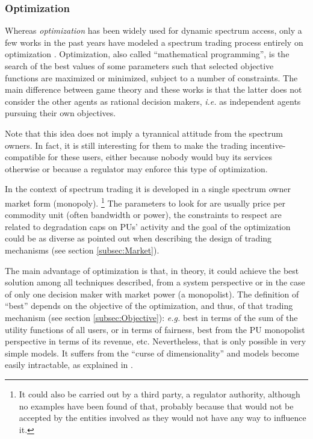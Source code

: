 \subsubsection{Optimization}
\label{sec:Optimization}
Whereas \textit{optimization} has been widely used for dynamic spectrum access, only a few works in the past years have modeled a spectrum trading process entirely on optimization \cite{ref:Mutlu2008,ref:Yang2011}. Optimization, also called ``mathematical programming'', is the search of the best values of some parameters such that selected objective functions are maximized or minimized, subject to a number of constraints. 
The main difference between game theory and these works is that the latter does not consider the other agents as rational decision makers, \textit{i.e.} as independent agents pursuing their own objectives. 

Note that this idea does not imply a tyrannical attitude from the spectrum owners. 
In fact, it is still interesting for them to make the trading incentive-compatible for these users, either because nobody would buy its services otherwise or because a regulator may enforce this type of optimization.

In the context of spectrum trading it is developed in a single spectrum owner market form (monopoly). \footnote {It could also be carried out by a third party, a regulator authority, although no examples have been found of that, probably because that would not be accepted by the entities involved as they would not have any way to influence it.}
The parameters to look for are usually price per commodity unit (often bandwidth or power), the constraints to respect are related to degradation caps on PUs' activity and the goal of the optimization could be as diverse as pointed out when describing the design of trading mechanisms (see section \ref{subsec:Market}).

The main advantage of optimization is that, in theory, it could achieve the best solution among all techniques described, from a system perspective or in the case of only one decision maker with market power (a monopolist). The definition of ``best'' depends on the objective of the optimization, and thus, of that trading mechanism (see section \ref{subsec:Objective}): \textit{e.g.} best in terms of the sum of the utility functions of all users, or in terms of fairness, best from the PU monopolist perspective in terms of its revenue, etc. 
Nevertheless, that is only possible in very simple models. 
It suffers from the ``curse of dimensionality'' and models become easily intractable, as explained in \cite{ref:Ji2006}.

